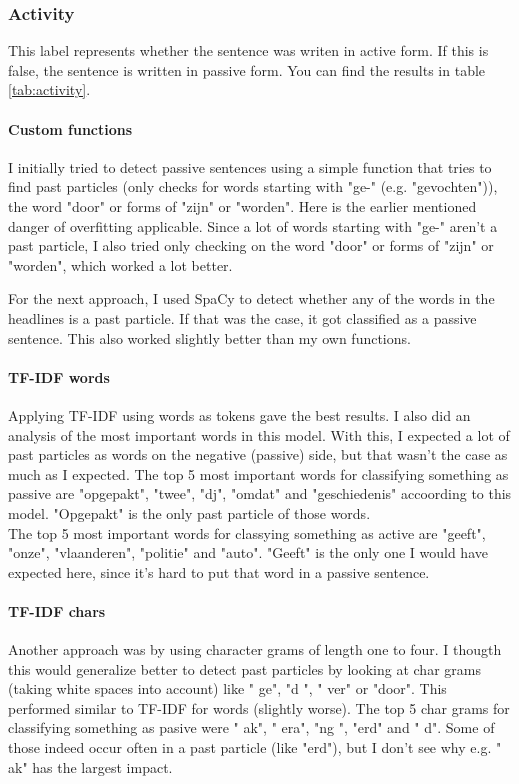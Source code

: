 \documentclass{article}
\begin{document}
\subsubsection{Activity}
This label represents whether the sentence was writen in active form. If this is false, the sentence is written in passive form. You can find the results in table \ref{tab:activity}.

\paragraph{Custom functions}
I initially tried to detect passive sentences using a simple function that tries to find past particles (only checks for words starting with "ge-" (e.g. "gevochten")), the word "door" or forms of "zijn" or "worden". Here is the earlier mentioned danger of overfitting applicable. Since a lot of words starting with "ge-" aren't a past particle, I also tried only checking on the word "door" or forms of "zijn" or "worden", which worked a lot better.

For the next approach, I used SpaCy to detect whether any of the words in the headlines is a past particle. If that was the case, it got classified as a passive sentence. This also worked slightly better than my own functions.

\paragraph{TF-IDF words} Applying TF-IDF using words as tokens gave the best results. I also did an analysis of the most important words in this model. With this, I expected a lot of past particles as words on the negative (passive) side, but that wasn't the case as much as I expected. The top 5 most important words for classifying something as passive are "opgepakt", "twee", "dj", "omdat" and "geschiedenis" accoording to this model. "Opgepakt" is the only past particle of those words. \\
The top 5 most important words for classying something as active are "geeft", "onze", "vlaanderen", "politie" and "auto". "Geeft" is the only one I would have expected here, since it's hard to put that word in a passive sentence.

\paragraph{TF-IDF chars} Another approach was by using character grams of length one to four. I thougth this would generalize better to detect past particles by looking at char grams (taking white spaces into account) like " ge", "d ", " ver" or "door". This performed similar to TF-IDF for words (slightly worse). The top 5 char grams for classifying something as pasive were " ak", " era", "ng ", "erd" and "  d". Some of those indeed occur often in a past particle (like "erd"), but I don't see why e.g. " ak" has the largest impact.
\end{document}
